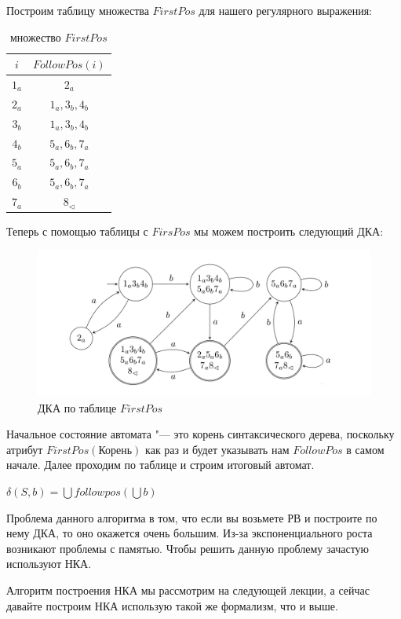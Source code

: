 \begin{multicols}{2}
Построим таблицу множества $FirstPos$ для нашего регулярного выражения:
\begin{table}[h!]
    \centering
    \begin{tabular}{c|c}
        $i$   & $FollowPos(i)$ \\ \hline
        $1_a$ & $2_a$          \\
        $2_a$ & $1_a,3_b,4_b$  \\
        $3_b$ & $1_a,3_b,4_b$  \\
        $4_b$ & $5_a,6_b,7_a$  \\
        $5_a$ & $5_a,6_b,7_a$  \\
        $6_b$ & $5_a,6_b,7_a$  \\
        $7_a$ & $8_{\lhd}$
    \end{tabular}
    \caption{множество $FirstPos$}
\end{table}

Теперь с помощью таблицы с $FirsPos$ мы можем построить следующий ДКА:
\begin{figure}[ht!p]
    \centering
    \includegraphics[scale=0.5]{images/DKA.PNG}
    \caption{ДКА по таблице $FirstPos$}
    \label{fig:DFA}
\end{figure}

Начальное состояние автомата "--- это корень синтаксического дерева, поскольку атрибут $FirstPos(\text{Корень})$ как раз и будет указывать нам $FollowPos$ в самом начале. Далее проходим по таблице и строим итоговый автомат.


$\delta(S,b) = \bigcup followpos(\bigcup b)$

Проблема данного алгоритма в том, что если вы возьмете РВ и построите по нему ДКА, то оно окажется очень большим. Из-за экспоненциального роста возникают проблемы с памятью. Чтобы решить данную проблему зачастую используют НКА.

Алгоритм построения НКА мы рассмотрим на следующей лекции, а сейчас давайте построим НКА использую такой же  формализм, что и выше.


\end{multicols}
